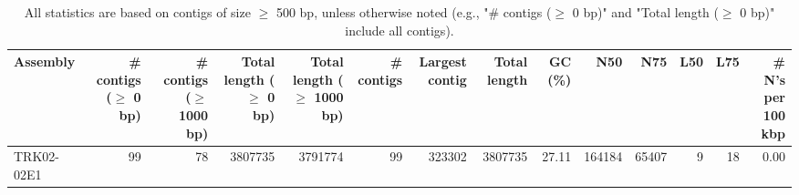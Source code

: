 \documentclass[12pt,a4paper]{article}
\begin{document}
\begin{table}[ht]
\begin{center}
\caption{All statistics are based on contigs of size $\geq$ 500 bp, unless otherwise noted (e.g., "\# contigs ($\geq$ 0 bp)" and "Total length ($\geq$ 0 bp)" include all contigs).}
\begin{tabular}{|l*{13}{|r}|}
\hline
Assembly & \# contigs ($\geq$ 0 bp) & \# contigs ($\geq$ 1000 bp) & Total length ($\geq$ 0 bp) & Total length ($\geq$ 1000 bp) & \# contigs & Largest contig & Total length & GC (\%) & N50 & N75 & L50 & L75 & \# N's per 100 kbp \\ \hline
TRK02-02E1 & 99 & 78 & 3807735 & 3791774 & 99 & 323302 & 3807735 & 27.11 & 164184 & 65407 & 9 & 18 & 0.00 \\ \hline
\end{tabular}
\end{center}
\end{table}
\end{document}
